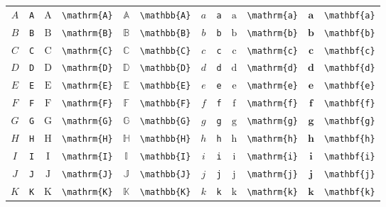 \begin{table}[th]
	\centering
	\renewcommand\arraystretch{0.99}
	\begin{tabular}{ c@{ }l c@{ }l c@{ }l c@{ }l c@{ }l c@{ }l}
		\hline
		$A$ & \verb|A| & $\mathrm{A}$ & \verb|\mathrm{A}| & $\mathbb{A}$ & \verb|\mathbb{A}| & $a$ & \verb|a| & $\mathrm{a}$ & \verb|\mathrm{a}| & $\mathbf{a}$ & \verb|\mathbf{a}| \\
		$B$ & \verb|B| & $\mathrm{B}$ & \verb|\mathrm{B}| & $\mathbb{B}$ & \verb|\mathbb{B}| & $b$ & \verb|b| & $\mathrm{b}$ & \verb|\mathrm{b}| & $\mathbf{b}$ & \verb|\mathbf{b}| \\
		$C$ & \verb|C| & $\mathrm{C}$ & \verb|\mathrm{C}| & $\mathbb{C}$ & \verb|\mathbb{C}| & $c$ & \verb|c| & $\mathrm{c}$ & \verb|\mathrm{c}| & $\mathbf{c}$ & \verb|\mathbf{c}| \\
		$D$ & \verb|D| & $\mathrm{D}$ & \verb|\mathrm{D}| & $\mathbb{D}$ & \verb|\mathbb{D}| & $d$ & \verb|d| & $\mathrm{d}$ & \verb|\mathrm{d}| & $\mathbf{d}$ & \verb|\mathbf{d}| \\
		$E$ & \verb|E| & $\mathrm{E}$ & \verb|\mathrm{E}| & $\mathbb{E}$ & \verb|\mathbb{E}| & $e$ & \verb|e| & $\mathrm{e}$ & \verb|\mathrm{e}| & $\mathbf{e}$ & \verb|\mathbf{e}| \\
		$F$ & \verb|F| & $\mathrm{F}$ & \verb|\mathrm{F}| & $\mathbb{F}$ & \verb|\mathbb{F}| & $f$ & \verb|f| & $\mathrm{f}$ & \verb|\mathrm{f}| & $\mathbf{f}$ & \verb|\mathbf{f}| \\
		$G$ & \verb|G| & $\mathrm{G}$ & \verb|\mathrm{G}| & $\mathbb{G}$ & \verb|\mathbb{G}| & $g$ & \verb|g| & $\mathrm{g}$ & \verb|\mathrm{g}| & $\mathbf{g}$ & \verb|\mathbf{g}| \\
		$H$ & \verb|H| & $\mathrm{H}$ & \verb|\mathrm{H}| & $\mathbb{H}$ & \verb|\mathbb{H}| & $h$ & \verb|h| & $\mathrm{h}$ & \verb|\mathrm{h}| & $\mathbf{h}$ & \verb|\mathbf{h}| \\
		$I$ & \verb|I| & $\mathrm{I}$ & \verb|\mathrm{I}| & $\mathbb{I}$ & \verb|\mathbb{I}| & $i$ & \verb|i| & $\mathrm{i}$ & \verb|\mathrm{i}| & $\mathbf{i}$ & \verb|\mathbf{i}| \\
		$J$ & \verb|J| & $\mathrm{J}$ & \verb|\mathrm{J}| & $\mathbb{J}$ & \verb|\mathbb{J}| & $j$ & \verb|j| & $\mathrm{j}$ & \verb|\mathrm{j}| & $\mathbf{j}$ & \verb|\mathbf{j}| \\
		$K$ & \verb|K| & $\mathrm{K}$ & \verb|\mathrm{K}| & $\mathbb{K}$ & \verb|\mathbb{K}| & $k$ & \verb|k| & $\mathrm{k}$ & \verb|\mathrm{k}| & $\mathbf{k}$ & \verb|\mathbf{k}| \\

\end{tabular}
\end{table}

